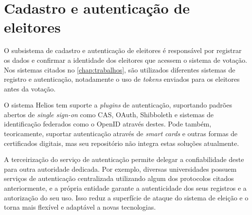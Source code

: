 \section{Cadastro e autenticação de eleitores}

O subsistema de cadastro e autenticação de eleitores é responsável por
registrar os dados e confirmar a identidade dos eleitores que acessem o sistema
de votação. Nos sistemas citados no \autoref{chap:trabalhos}, são utilizados
diferentes sistemas de registro e autenticação, notadamente o uso de
\textit{tokens} enviados para os eleitores antes da votação.

O sistema Helios tem suporte a \textit{plugins} de autenticação, suportando
padrões abertos de \textit{single sign-on} como CAS, OAuth, Shibboleth e
sistemas de identificação federados como o OpenID através destes. Pode também,
teoricamente, suportar autenticação através de \textit{smart cards} e outras
formas de certificados digitais, mas seu repositório não integra estas soluções
atualmente.

A terceirização do serviço de autenticação permite delegar a confiabilidade
deste para outra autoridade dedicada. Por exemplo, diversas universidades
possuem serviços de autenticação centralizada utilizando algum dos protocolos
citados anteriormente, e a própria entidade garante a autenticidade dos seus
registros e a autorização do seu uso. Isso reduz a superfície de ataque do
sistema de eleição e o torna mais flexível e adaptável a novas tecnologias.
